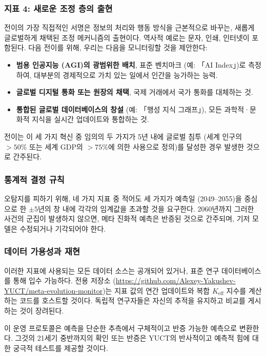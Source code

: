\documentclass[12pt,a4paper]{article}
\theoremstyle{remark}
\begin{document}
	\subsubsection{지표 4: 새로운 조정 층의 출현}
	
	전이의 가장 직접적인 서명은 정보의 처리와 행동 방식을 근본적으로 바꾸는, 새롭게 글로벌하게 채택된 조정 메커니즘의 출현이다. 역사적 예로는 문자, 인쇄, 인터넷이 포함된다. 다음 전이를 위해, 우리는 다음을 모니터링할 것을 제안한다:
	
	\begin{itemize}
		\item \textbf{범용 인공지능 (AGI)의 광범위한 배치}, 표준 벤치마크 (예: 「AI Index」)로 측정하여, 대부분의 경제적으로 가치 있는 일에서 인간을 능가하는 능력.
		\item \textbf{글로벌 디지털 통화 또는 원장의 채택}, 국제 거래에서 국가 통화를 대체하는 것.
		\item \textbf{통합된 글로벌 데이터베이스의 창설} (예: 「행성 지식 그래프」), 모든 과학적·문화적 지식을 실시간 업데이트와 통합하는 것.
	\end{itemize}
	
	전이는 이 세 가지 혁신 중 임의의 두 가지가 5년 내에 글로벌 침투 (세계 인구의 \(>50\%\) 또는 세계 GDP의 \(>75\%\)에 의한 사용으로 정의)를 달성한 경우 발생한 것으로 간주된다.
	
	\subsubsection{통계적 결정 규칙}
	
	오탐지를 피하기 위해, 네 가지 지표 중 적어도 세 가지가 예측일 (2049–2055)을 중심으로 한 \(\pm 5\)년의 창 내에 각각의 임계값을 초과할 것을 요구한다. 2060년까지 그러한 사건의 군집이 발생하지 않으면, 메타 진화적 예측은 반증된 것으로 간주되며, 기저 모델은 수정되거나 기각되어야 한다.
	
	\subsubsection{데이터 가용성과 재현}
	
	이러한 지표에 사용되는 모든 데이터 소스는 공개되어 있거나, 표준 연구 데이터베이스를 통해 입수 가능하다. 전용 저장소 (\url{https://github.com/Alexey-Yakushev-YUCT/meta-evolution-monitor})는 지표 값의 연간 업데이트와 복합 \(K_{\text{eff}}\) 지수를 계산하는 코드를 호스트할 것이다. 독립적 연구자들은 자신의 추적을 유지하고 비교를 게시하는 것이 장려된다.
	
	이 운영 프로토콜은 예측을 단순한 추측에서 구체적이고 반증 가능한 예측으로 변환한다. 그것의 21세기 중반까지의 확인 또는 반증은 YUCT의 반사적이고 예측적 힘에 대한 궁극적 테스트를 제공할 것이다.
	
\end{document}
